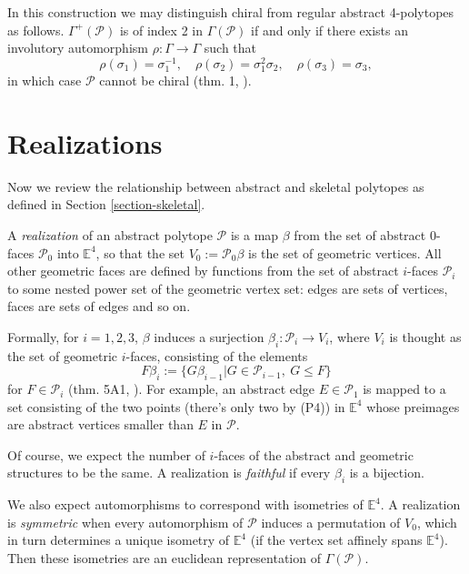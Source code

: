 In this construction we may distinguish
chiral from regular abstract 4-polytopes as
follows. $\Gamma^+(\mathcal{P})$ is of index
2 in $\Gamma(\mathcal{P})$ if and only if
there exists an involutory automorphism
$\rho:\Gamma\to \Gamma$ such that
\begin{equation}
\label{equation-combinatorially-chiral}
\rho(\sigma_1)=\sigma_1^{-1},\quad
\rho(\sigma_2)=\sigma_1^2\sigma_2,\quad
\rho(\sigma_3)=\sigma_3,
\end{equation}
in which case $\mathcal{P}$ cannot be chiral
(thm. 1, \cite{schulte-chiral}).

\section{Realizations}
\label{section-realizations}

\noindent
Now we review the relationship between
abstract and skeletal polytopes as defined in
Section \ref{section-skeletal}.

A \textit{realization} of an abstract
polytope $\mathcal{P}$ is a map $\beta$ from
the set of abstract 0-faces $\mathcal{P}_0$
into $\mathbb{E}^4$, so that the set
$V_0:=\mathcal{P}_0\beta$ is the set of
geometric vertices. All other geometric faces
are defined by functions from the set of
abstract $i$-faces $\mathcal{P}_i$ to some
nested power set of the geometric vertex set:
edges are sets of vertices, faces are sets of
edges and so on.

Formally, for $i=1,2,3$, $\beta$ induces a
surjection $\beta_i:\mathcal{P}_i\to V_i$,
where $V_i$ is thought as the set of
geometric $i$-faces, consisting of the
elements
$$
F\beta_i:=\{G\beta_{i-1}|
G\in\mathcal{P}_{i-1},\ G\leq F\}
$$
for $F\in\mathcal{P}_i$ (thm. 5A1,
\cite{abstract-polytopes}). For example, an
abstract edge $E\in\mathcal{P}_1$ is mapped
to a set consisting of the two points
(there's only two by (P4)) in $\mathbb{E}^4$
whose preimages are abstract vertices smaller
than $E$ in $\mathcal{P}$.

Of course, we expect the number of $i$-faces
of the abstract and geometric structures to
be the same. A realization is
\textit{faithful} if every $\beta_i$ is a
bijection.

We also expect automorphisms to correspond
with isometries of $\mathbb{E}^4$. A
realization is \textit{symmetric} when every
automorphism of $\mathcal{P}$ induces a
permutation of $V_0$, which in turn
determines a unique isometry of
$\mathbb{E}^4$ (if the vertex set affinely
spans $\mathbb{E}^4$). Then these isometries
are an euclidean representation of
$\Gamma(\mathcal{P})$.

